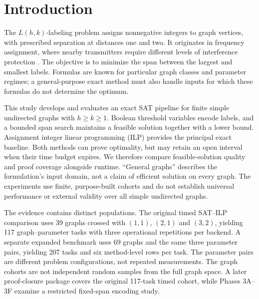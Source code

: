 \section{Introduction}
The $L(h,k)$-labeling problem assigns nonnegative integers to graph
vertices, with prescribed separation at distances one and two. It
originates in frequency assignment, where nearby transmitters require
different levels of interference protection \cite{griggs,calamoneri}.
The objective is to minimize the span between the largest and smallest
labels. Formulas are known for particular graph classes and parameter
regimes; a general-purpose exact method must also handle inputs for which
these formulas do not determine the optimum.

This study develops and evaluates an exact SAT pipeline for finite simple
undirected graphs with $h\geq k\geq1$. Boolean threshold variables encode
labels, and a bounded span search maintains a feasible solution together
with a lower bound. Assignment integer linear programming (ILP) provides
the principal exact baseline. Both methods can prove optimality, but may
retain an open interval when their time budget expires. We therefore
compare feasible-solution quality and proof coverage alongside runtime.
``General graphs'' describes the formulation's input domain, not a claim
of efficient solution on every graph. The experiments use finite,
purpose-built cohorts and do not establish universal performance or
external validity over all simple undirected graphs.

The evidence contains distinct populations. The original timed SAT--ILP
comparison uses 39 graphs crossed with $(1,1)$, $(2,1)$ and $(3,2)$,
yielding 117 graph--parameter tasks with three operational repetitions per
backend. A separate expanded benchmark uses 69 graphs and the same three
parameter pairs, yielding 207 tasks and six method-level rows per task.
The parameter pairs are different problem configurations, not repeated
measurements. The graph cohorts are not independent random samples from
the full graph space. A later proof-closure package covers the original
117-task timed cohort, while Phases 3A--3F examine a restricted fixed-span
encoding study.

